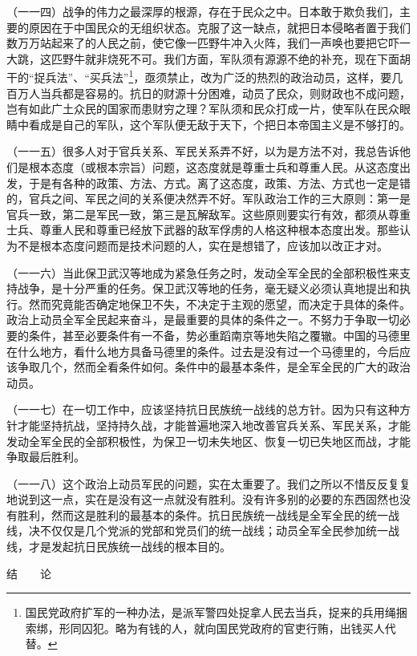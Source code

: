 \documentclass[UTF8, 12pt, a4paper]{ctexrep}
\begin{document}
（一一四）战争的伟力之最深厚的根源，存在于民众之中。日本敢于欺负我们，主要的原因在于中国民众的无组织状态。克服了这一缺点，就把日本侵略者置于我们数万万站起来了的人民之前，使它像一匹野牛冲入火阵，我们一声唤也要把它吓一大跳，这匹野牛就非烧死不可。我们方面，军队须有源源不绝的补充，现在下面胡干的“捉兵法”、“买兵法”\footnote{国民党政府扩军的一种办法，是派军警四处捉拿人民去当兵，捉来的兵用绳捆索绑，形同囚犯。略为有钱的人，就向国民党政府的官吏行贿，出钱买人代替。}，亟须禁止，改为广泛的热烈的政治动员，这样，要几百万人当兵都是容易的。抗日的财源十分困难，动员了民众，则财政也不成问题，岂有如此广土众民的国家而患财穷之理？军队须和民众打成一片，使军队在民众眼睛中看成是自己的军队，这个军队便无敌于天下，个把日本帝国主义是不够打的。

（一一五）很多人对于官兵关系、军民关系弄不好，以为是方法不对，我总告诉他们是根本态度（或根本宗旨）问题，这态度就是尊重士兵和尊重人民。从这态度出发，于是有各种的政策、方法、方式。离了这态度，政策、方法、方式也一定是错的，官兵之间、军民之间的关系便决然弄不好。军队政治工作的三大原则：第一是官兵一致，第二是军民一致，第三是瓦解敌军。这些原则要实行有效，都须从尊重士兵、尊重人民和尊重已经放下武器的敌军俘虏的人格这种根本态度出发。那些认为不是根本态度问题而是技术问题的人，实在是想错了，应该加以改正才对。

（一一六）当此保卫武汉等地成为紧急任务之时，发动全军全民的全部积极性来支持战争，是十分严重的任务。保卫武汉等地的任务，毫无疑义必须认真地提出和执行。然而究竟能否确定地保卫不失，不决定于主观的愿望，而决定于具体的条件。政治上动员全军全民起来奋斗，是最重要的具体的条件之一。不努力于争取一切必要的条件，甚至必要条件有一不备，势必重蹈南京等地失陷之覆辙。中国的马德里在什么地方，看什么地方具备马德里的条件。过去是没有过一个马德里的，今后应该争取几个，然而全看条件如何。条件中的最基本条件，是全军全民的广大的政治动员。

（一一七）在一切工作中，应该坚持抗日民族统一战线的总方针。因为只有这种方针才能坚持抗战，坚持持久战，才能普遍地深入地改善官兵关系、军民关系，才能发动全军全民的全部积极性，为保卫一切未失地区、恢复一切已失地区而战，才能争取最后胜利。

（一一八）这个政治上动员军民的问题，实在太重要了。我们之所以不惜反反复复地说到这一点，实在是没有这一点就没有胜利。没有许多别的必要的东西固然也没有胜利，然而这是胜利的最基本的条件。抗日民族统一战线是全军全民的统一战线，决不仅仅是几个党派的党部和党员们的统一战线；动员全军全民参加统一战线，才是发起抗日民族统一战线的根本目的。

结　　论
\end{document}

